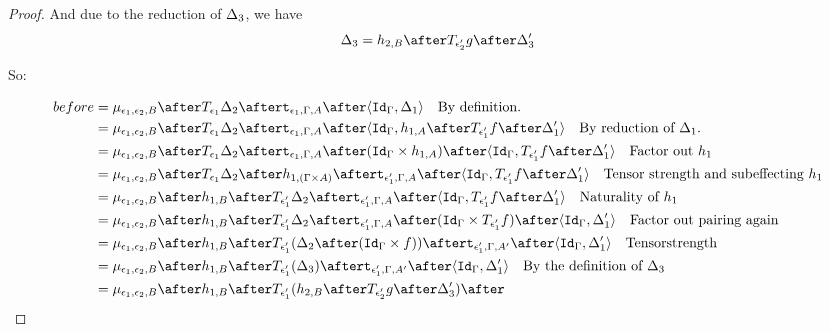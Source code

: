 \documentclass{report}
\begin{document}
\begin{framed}
\begin{proof}
                    And due to the reduction of $\Delta_3$,
                    we have 
                    \begin{equation}
                        \D_3 = h_{2, B} \after \T{\e_2'}{g}\after \D_3'
                    \end{equation}
        
                    So:
        
                    \begin{align*}
                        before &= \bind{\e_1}{\e_2}{B}\after \T{\e_1}{\D_2}\after\tstrength{\e_1}{\G}{A}\after\pr{\idg}{\D_1}\qt{By definition.}\\
                        &= \bind{\e_1}{\e_2}{B}\after \T{\e_1}{\D_2}\after\tstrength{\e_1}{\G}{A}\after\pr{\idg}{h_{1, A}\after\T{\e_1'}{f}\after\D_1'}\qt{By reduction of $\D_1$.}\\
                        &= \bind{\e_1}{\e_2}{B}\after \T{\e_1}{\D_2}\after\tstrength{\e_1}{\G}{A}\after(\idg\times h_{1, A})\after\pr{\idg}{\T{\e_1'}{f}\after\D_1'}\qt{Factor out $h_1$}\\
                        &= \bind{\e_1}{\e_2}{B}\after \T{\e_1}{\D_2}\after
                        h_{1, (\G\times A)}\after
                        \tstrength{\e_1'}{\G}{A}\after\pr{\idg}{\T{\e_1'}{f}\after\D_1'}\qt{Tensor strength and subeffecting $h_1$}\\
                        &= \bind{\e_1}{\e_2}{B}\after 
                        h_{1, B}\after\T{\e_1'}{\D_2}\after
                        \tstrength{\e_1'}{\G}{A}\after\pr{\idg}{\T{\e_1'}{f}\after\D_1'}\qt{Naturality of $h_1$}\\
                        &= \bind{\e_1}{\e_2}{B}\after 
                        h_{1, B}\after\T{\e_1'}{\D_2}\after
                        \tstrength{\e_1'}{\G}{A}\after(\idg\times \T{\e_1'}{f})\after\pr{\idg}{\D_1'}\qt{Factor out pairing again}\\
                        &= \bind{\e_1}{\e_2}{B}\after 
                        h_{1, B}\after\T{\e_1'}{(\D_2\after(\idg\times f))}\after
                        \tstrength{\e_1'}{\G}{A'}\after\pr{\idg}{\D_1'}\qt{Tensorstrength}\\
                        &= \bind{\e_1}{\e_2}{B}\after 
                        h_{1, B}\after\T{\e_1'}{(\D_3)}\after
                        \tstrength{\e_1'}{\G}{A'}\after\pr{\idg}{\D_1'}\qt{By the definition of $\D_3$}\\
                        &= \bind{\e_1}{\e_2}{B}\after 
                        h_{1, B}\after\T{\e_1'}{(h_{2, B}\after\T{\e_2'}{g}\after \D_3')}\after

\end{align*}
\end{proof}
\end{framed}
\end{document}
